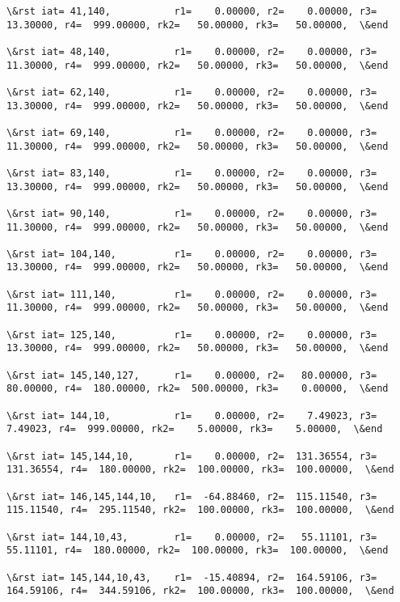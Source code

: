 \documentclass[11pt]{article}
\begin{document}
\begin{Verbatim}[commandchars=\\\{\}]
\&rst iat= 41,140,           r1=    0.00000, r2=    0.00000, r3=   13.30000, r4=  999.00000, rk2=   50.00000, rk3=   50.00000,  \&end

\&rst iat= 48,140,           r1=    0.00000, r2=    0.00000, r3=   11.30000, r4=  999.00000, rk2=   50.00000, rk3=   50.00000,  \&end

\&rst iat= 62,140,           r1=    0.00000, r2=    0.00000, r3=   13.30000, r4=  999.00000, rk2=   50.00000, rk3=   50.00000,  \&end

\&rst iat= 69,140,           r1=    0.00000, r2=    0.00000, r3=   11.30000, r4=  999.00000, rk2=   50.00000, rk3=   50.00000,  \&end

\&rst iat= 83,140,           r1=    0.00000, r2=    0.00000, r3=   13.30000, r4=  999.00000, rk2=   50.00000, rk3=   50.00000,  \&end

\&rst iat= 90,140,           r1=    0.00000, r2=    0.00000, r3=   11.30000, r4=  999.00000, rk2=   50.00000, rk3=   50.00000,  \&end

\&rst iat= 104,140,          r1=    0.00000, r2=    0.00000, r3=   13.30000, r4=  999.00000, rk2=   50.00000, rk3=   50.00000,  \&end

\&rst iat= 111,140,          r1=    0.00000, r2=    0.00000, r3=   11.30000, r4=  999.00000, rk2=   50.00000, rk3=   50.00000,  \&end

\&rst iat= 125,140,          r1=    0.00000, r2=    0.00000, r3=   13.30000, r4=  999.00000, rk2=   50.00000, rk3=   50.00000,  \&end

\&rst iat= 145,140,127,      r1=    0.00000, r2=   80.00000, r3=   80.00000, r4=  180.00000, rk2=  500.00000, rk3=    0.00000,  \&end

\&rst iat= 144,10,           r1=    0.00000, r2=    7.49023, r3=    7.49023, r4=  999.00000, rk2=    5.00000, rk3=    5.00000,  \&end

\&rst iat= 145,144,10,       r1=    0.00000, r2=  131.36554, r3=  131.36554, r4=  180.00000, rk2=  100.00000, rk3=  100.00000,  \&end

\&rst iat= 146,145,144,10,   r1=  -64.88460, r2=  115.11540, r3=  115.11540, r4=  295.11540, rk2=  100.00000, rk3=  100.00000,  \&end

\&rst iat= 144,10,43,        r1=    0.00000, r2=   55.11101, r3=   55.11101, r4=  180.00000, rk2=  100.00000, rk3=  100.00000,  \&end

\&rst iat= 145,144,10,43,    r1=  -15.40894, r2=  164.59106, r3=  164.59106, r4=  344.59106, rk2=  100.00000, rk3=  100.00000,  \&end


\end{Verbatim}
\end{document}
